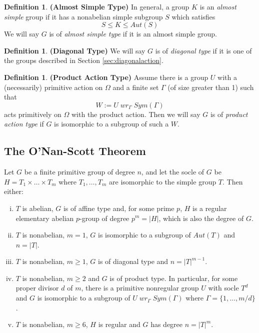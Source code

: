\documentclass[]{article}
\theoremstyle{definition}
\newtheorem{defn}[thm]{Definition}
\begin{document}
\begin{defn} \textbf{(Almost Simple Type)}
	In general, a group $K$ is an \emph{almost simple} group if it has a nonabelian simple subgroup $S$ which satisfies
	$$S \leqslant K \leqslant Aut(S)$$
	We will say $G$ is of \emph{almost simple type} if it is an almost simple group.
\end{defn}

\begin{defn} \textbf{(Diagonal Type)} 
	We will say $G$ is of \emph{diagonal type} if it is one of the groups described in Section \ref{sec:diagonalaction}.
\end{defn}

\begin{defn} \textbf{(Product Action Type)}
	Assume there is a group $U$ with a (necessarily) primitive action on $\Omega$ and a finite set $\Gamma$ (of size greater than 1) such that $$W:=U \; wr_\Gamma \; Sym(\Gamma)$$
	acts primitively on $\Omega$ with the product action. Then we will say $G$ is of \emph{product action type} if $G$ is isomorphic to a subgroup of such a $W$.
\end{defn}

\subsection{The O'Nan-Scott Theorem}
Let $G$ be a finite primitive group of degree $n$, and let the socle of $G$ be $H=T_1 \times \dots \times T_m$ where $T_1,\dots,T_m$ are isomorphic to the simple group $T$. Then either:
\begin{enumerate}[(i)]
	\item $T$ is abelian, $G$ is of affine type and, for some prime $p$, $H$ is a regular elementary abelian $p$-group of degree $p^m = |H|$, which is also the degree of $G$.
	\vspace{-0.2cm}	\item $T$ is nonabelian, $m=1$, $G$ is isomorphic to a subgroup of $Aut(T)$ and $n=|T|$.
	\vspace{-0.2cm}	\item $T$ is nonabelian, $m\geq1$, $G$ is of diagonal type and $n=|T|^{m-1}$.
	\vspace{-0.2cm}	\item $T$ is nonabelian, $m\geq2$ and $G$ is of product type. In particular, for some proper divisor $d$ of $m$, there is a primitive nonregular group $U$ with socle $T^d$ and $G$ is isomorphic to a subgroup of $U \; wr_\Gamma \; Sym(\Gamma)$ where $\Gamma = \{1,\dots,m/d \}$.
	\vspace{-0.2cm}	\item $T$ is nonabelian, $m\geq6$, $H$ is regular and $G$ has degree $n=|T|^{m}$.
\end{enumerate}
\end{document}
